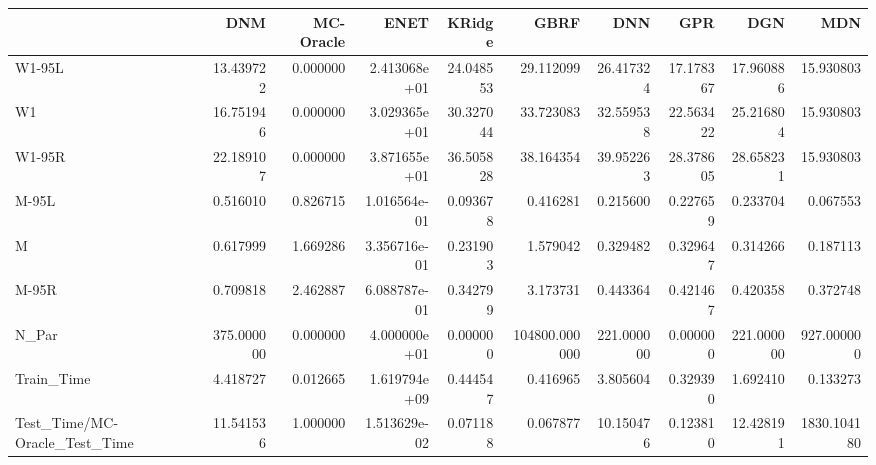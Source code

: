 \begin{tabular}{lrrrrrrrrr}
\toprule
{} &         DNM &  MC-Oracle &          ENET &     KRidge &           GBRF &         DNN &        GPR &         DGN &          MDN \\
\midrule
W1-95L                        &   13.439722 &   0.000000 &  2.413068e+01 &  24.048553 &      29.112099 &   26.417324 &  17.178367 &   17.960886 &    15.930803 \\
W1                            &   16.751946 &   0.000000 &  3.029365e+01 &  30.327044 &      33.723083 &   32.559538 &  22.563422 &   25.216804 &    15.930803 \\
W1-95R                        &   22.189107 &   0.000000 &  3.871655e+01 &  36.505828 &      38.164354 &   39.952263 &  28.378605 &   28.658231 &    15.930803 \\
M-95L                         &    0.516010 &   0.826715 &  1.016564e-01 &   0.093678 &       0.416281 &    0.215600 &   0.227659 &    0.233704 &     0.067553 \\
M                             &    0.617999 &   1.669286 &  3.356716e-01 &   0.231903 &       1.579042 &    0.329482 &   0.329647 &    0.314266 &     0.187113 \\
M-95R                         &    0.709818 &   2.462887 &  6.088787e-01 &   0.342799 &       3.173731 &    0.443364 &   0.421467 &    0.420358 &     0.372748 \\
N\_Par                         &  375.000000 &   0.000000 &  4.000000e+01 &   0.000000 &  104800.000000 &  221.000000 &   0.000000 &  221.000000 &   927.000000 \\
Train\_Time                    &    4.418727 &   0.012665 &  1.619794e+09 &   0.444547 &       0.416965 &    3.805604 &   0.329390 &    1.692410 &     0.133273 \\
Test\_Time/MC-Oracle\_Test\_Time &   11.541536 &   1.000000 &  1.513629e-02 &   0.071188 &       0.067877 &   10.150476 &   0.123810 &   12.428191 &  1830.104180 \\
\bottomrule
\end{tabular}
